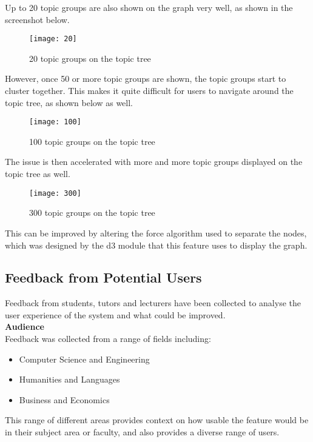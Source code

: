 Up to 20 topic groups are also shown on the graph very well, as shown in the screenshot below.
\begin{figure}[h!]
    \centering
    \texttt{[image: 20]}
    \caption{20 topic groups on the topic tree}
\end{figure}

However, once 50 or more topic groups are shown, the topic groups start to cluster together. This makes it quite difficult for users to navigate around the topic tree, as shown below as well.

\begin{figure}[h!]
    \centering
    \texttt{[image: 100]}
    \caption{100 topic groups on the topic tree}
\end{figure}

The issue is then accelerated with more and more topic groups displayed on the topic tree as well.

\begin{figure}[h!]
    \centering
    \texttt{[image: 300]}
    \caption{300 topic groups on the topic tree}
\end{figure}

This can be improved by altering the force algorithm used to separate the nodes, which was designed by the d3 module that this feature uses to display the graph. 

\subsection{Feedback from Potential Users}
Feedback from students, tutors and lecturers have been collected to analyse the user experience of the system and what could be improved. \\

\textbf{Audience} \\

Feedback was collected from a range of fields including:\\
\begin{itemize}
    \item Computer Science and Engineering
    \item Humanities and Languages 
    \item Business and Economics 
\end{itemize}

This range of different areas provides context on how usable the feature would be in their subject area or faculty, and also provides a diverse range of users.\\

